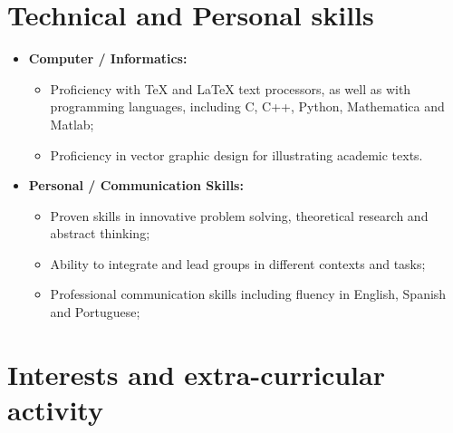 \documentclass[11pt,a4paper,sans]{moderncv}        %
\begin{document}
\section{Technical and Personal skills}

\vspace{4pt}

\begin{itemize}

\item \textbf{Computer / Informatics:} 
\begin{itemize}
\item Proficiency with TeX and LaTeX text processors, as well as with programming languages, including C, C++, Python, Mathematica and Matlab;
\item Proficiency in vector graphic design for illustrating academic texts. 
\end{itemize}

\item \textbf{Personal / Communication Skills:} 

\begin{itemize}
\item Proven skills in innovative problem solving, theoretical research and abstract thinking;
\vspace{1pt}
\item Ability to integrate and lead groups in different contexts and tasks; 
\vspace{1pt}
\item Professional communication skills including fluency in English, Spanish and Portuguese;

\end{itemize}

\end{itemize}

\section{Interests and extra-curricular activity}

\vspace{3pt}
\end{document}
